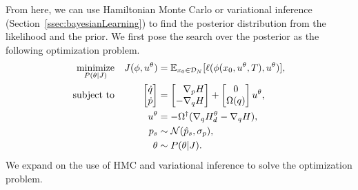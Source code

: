 From here, we can use Hamiltonian Monte Carlo or variational inference
(Section~\ref{ssec:bayesianLearning}) to find the posterior distribution from
the likelihood and the prior.
%
We first pose the search over the posterior as the following optimization
problem.
\begin{equation}
    \begin{aligned}
        \underset{P(\theta | J)}{\textrm{minimize}} 
        & & J(\phi, u^\theta) &= \mathbb{E}_{x_0 \in \mathcal{D}_N}[ \ell( \phi(x_0, u^\theta, T), u^\theta) ]  , \\
        \textrm{subject to}
        & & \bmat{\dot{q} \\ \dot{p}} &= \bmat{\phantom{-}\nabla_p H \\ -\nabla_q H} + \bmat{0 \\ \Omega(q)}u^{\theta}, \\%
        & & u^{\theta} &= -\Omega^{\dagger} (\nabla_q H_d^{\theta} - \nabla_q H), \\
        & & p_s &\sim \mathcal{N}(\hat{p}_s, \sigma_p), \\
        & & \theta &\sim P(\theta | J).
    \end{aligned}
    \label{eq:smooth_bayesian_pbc}
\end{equation}
We expand on the use of HMC and variational inference to solve the optimization
problem.
%
